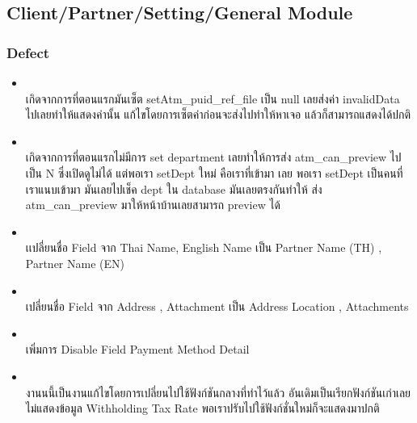\subsection{Client/Partner/Setting/General Module}

\subsubsection{Defect}
\begin{itemize}
    \setlength\itemsep{1em}
    \item \textbf{} \\
          เกิดจากการที่ตอนแรกมันเซ็ต setAtm\_puid\_ref\_file เป็น null เลยส่งค่า invalidData ไปเลยทำให้แสดงค่านั้น แก้ไขโดยการเซ็ตค่าก่อนจะส่งไปทำให้หาเจอ แล้วก็สามารถแสดงได้ปกติ      
    \item \textbf{} \\
          เกิดจากการที่ตอนแรกไม่มีการ set department เลยทำให้การส่ง atm\_can\_preview ไปเป็น N ซึ่งเปิดดูไม่ได้ แต่พอเรา setDept ใหม่ คือเราที่เข้ามา เลย พอเรา setDept เป็นคนที่เราแนบเข้ามา มันเลยไปเช็ค dept ใน database มันเลยตรงกันทำให้ ส่ง atm\_can\_preview มาให้หน้าบ้านเลยสามารถ preview ได้
    \item \textbf{} \\
          เเปลี่ยนชื่อ Field จาก Thai Name, English Name เป็น Partner Name (TH) , Partner Name (EN)
    \item \textbf{} \\
          เปลี่ยนชื่อ Field จาก Address , Attachment เป็น Address Location , Attachments
    \item \textbf{} \\
          เพิ่มการ Disable Field Payment Method Detail
    \item \textbf{} \\
          งานนนี้เป็นงานแก้ไขโดยการเปลี่ยนไปใช้ฟังก์ชันกลางที่ทำไว้แล้ว อันเดิมเป็นเรียกฟังก์ชันเก่าเลยไม่แสดงข้อมูล Withholding Tax Rate พอเราปรับไปใช้ฟังก์ชั่นใหม่ก็จะแสดงมาปกติ     

\end{itemize}
